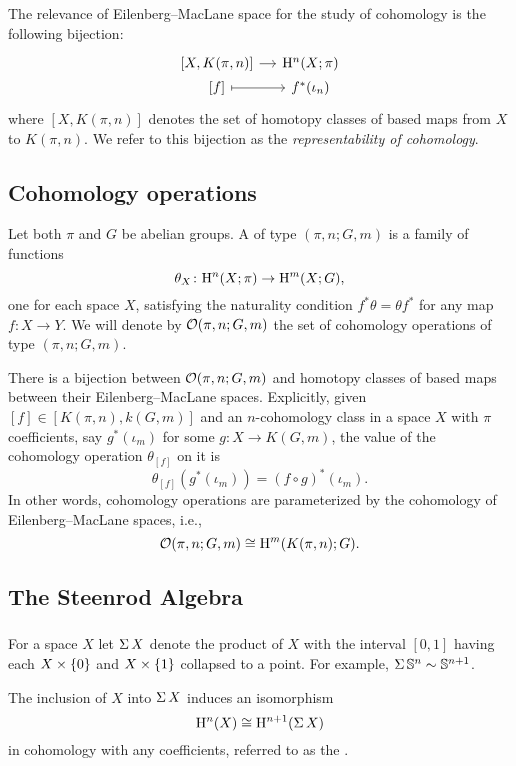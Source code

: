 The relevance of Eilenberg--MacLane space for the study of cohomology is the following bijection:
\[
\begin{tikzcd}[column sep=small, row sep=0]
	{[X, K(\pi, n)]} \rar & \rH^n(X; \pi) \\
	{[f]} \rar[maps to] & f^*(\iota_n)
\end{tikzcd}
\]
where $[X, K(\pi, n)]$ denotes the set of homotopy classes of based maps from $X$ to $K(\pi, n)$.
We refer to this bijection as the \textit{representability of cohomology}.

\subsection{Cohomology operations}

Let both $\pi$ and $G$ be abelian groups.
A  of type $(\pi, n; G, m)$ is a family of functions
\[
\theta_X \colon \mathrm{H}^n(X; \pi) \rightarrow \mathrm{H}^m(X; G),
\]
one for each space $X$, satisfying the naturality condition $f^* \theta = \theta f^*$ for any map $f \colon X \rightarrow Y$.
We will denote by $\mathcal{O}(\pi, n; G,m)$ the set of cohomology operations of type $(\pi, n; G,m)$.

There is a bijection between $\mathcal{O}(\pi, n; G,m)$ and homotopy classes of based maps between their Eilenberg--MacLane spaces.
Explicitly, given $[f] \in [K(\pi,n), k(G,m)]$ and an $n$-cohomology class in a space $X$ with $\pi$ coefficients, say $g^*(\iota_m)$ for some $g \colon X \to K(G, m)$, the value of the cohomology operation $\theta_{[f]}$ on it is
\[
\theta_{[f]}(g^*(\iota_m)) = (f \circ g)^*(\iota_m).
\]
In other words, cohomology operations are parameterized by the cohomology of Eilenberg--MacLane spaces, i.e.,
\[
\mathcal{O}(\pi, n; G,m) \cong \mathrm{H}^m(K(\pi,n); G).
\]

\subsection{The Steenrod Algebra}\label{ss:steenrod}

\subsubsection{} For a space $X$ let $\operatorname{\Sigma} X$ denote the product of $X$ with the interval $[0,1]$ having each $X \times \{0\}$ and $X \times \{1\}$ collapsed to a point.
For example, $\operatorname{\Sigma} \mathbb{S}^n \sim \mathbb{S}^{n+1}$.

The inclusion of $X$ into $\operatorname{\Sigma} X$ induces an isomorphism
\[
\mathrm{H}^n(X) \cong \mathrm{H}^{n+1}(\operatorname{\Sigma} X)
\]
in cohomology with any coefficients, referred to as the .

